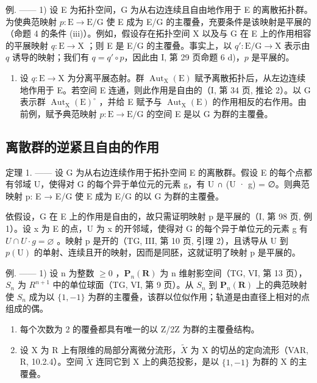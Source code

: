 例. —— 1) 设 E 为拓扑空间，G 为从右边连续且自由地作用于 E 的离散拓扑群。为使典范映射 \(p \colon \mathrm{E} \to \mathrm{E} / \mathrm{G}\) 使 E 成为 E/G 的主覆叠，充要条件是该映射是平展的（命题 4 的条件 (iii)）。例如，假设存在拓扑空间 X 以及与 G 在 E 上的作用相容的平展映射 \(q \colon \mathrm{E} \to \mathrm{X}\) ；则 E 是 E/G 的主覆叠。事实上，以 \(q' \colon \mathrm{E} / \mathrm{G} \to \mathrm{X}\) 表示由 \(q\) 诱导的映射；我们有 \(q = q' \circ p\)，因此由 I, 第 29 页命题 6 d)，\(p\) 是平展的。

\begin{enumerate}
\def\labelenumi{\arabic{enumi})}
\setcounter{enumi}{1}
\tightlist
\item
  设 \(q \colon \mathrm{E} \to \mathrm{X}\) 为分离平展态射。群 \(\operatorname{Aut}_{\mathrm{X}}(\mathrm{E})\) 赋予离散拓扑后，从左边连续地作用于 E。若空间 E 连通，则此作用是自由的（I, 第 34 页, 推论 2）。以 G 表示群 \(\operatorname{Aut}_{\mathrm{X}}(\mathrm{E})^{\circ}\) ，并给 E 赋予与 \(\operatorname{Aut}_{\mathrm{X}}(\mathrm{E})\) 的作用相反的右作用。由前例，赋予典范映射 \(p \colon \mathrm{E} \to \mathrm{E} / \mathrm{G}\) 的空间 E 是以 G 为群的主覆叠。
\end{enumerate}

\subsection{离散群的逆紧且自由的作用}

定理 1. —— 设 G 为从右边连续作用于拓扑空间 E 的离散群。假设 E 的每个点都有邻域 U，使得对 G 的每个异于单位元的元素 g，有 U ∩ (U · g) = ∅。则典范映射 p: E → E/G 使 E 成为 E/G 的以 G 为群的主覆叠。

依假设，G 在 E 上的作用是自由的，故只需证明映射 p 是平展的（I, 第 98 页, 例 1）。设 x 为 E 的点，U 为 x 的开邻域，使得对 G 的每个异于单位元的元素 g 有 \(U \cap U \cdot g = \varnothing\) 。映射 p 是开的（TG, III, 第 10 页, 引理 2），且诱导从 U 到 \(p(\mathrm{U})\) 的单射、连续且开的映射，因而是同胚，这就证明了映射 p 是平展的。

例. —— 1) 设 n 为整数 \(\geqslant 0\) ，\(\mathbf{P}_{n}(\mathbf{R})\) 为 n 维射影空间（TG, VI, 第 13 页），\(S_{n}\) 为 \(R^{n+1}\) 中的单位球面（TG, VI, 第 9 页）。从 \(S_{n}\) 到 \(\mathbf{P}_{n}(\mathbf{R})\) 上的典范映射使 \(S_{n}\) 成为以 \(\{1,-1\}\) 为群的主覆叠，该群以位似作用；轨道是由直径上相对的点组成的偶。

\begin{enumerate}
\def\labelenumi{\arabic{enumi})}
\setcounter{enumi}{1}
\item
  每个次数为 2 的覆叠都具有唯一的以 Z/2Z 为群的主覆叠结构。
\item
  设 X 为 R 上有限维的局部分离微分流形，\(\widetilde{X}\) 为 X 的切丛的定向流形（VAR, R, 10.2.4）。空间 \(\widetilde{X}\) 连同它到 X 上的典范投影，是以 \(\{1,-1\}\) 为群的 X 的主覆叠。
\end{enumerate}


